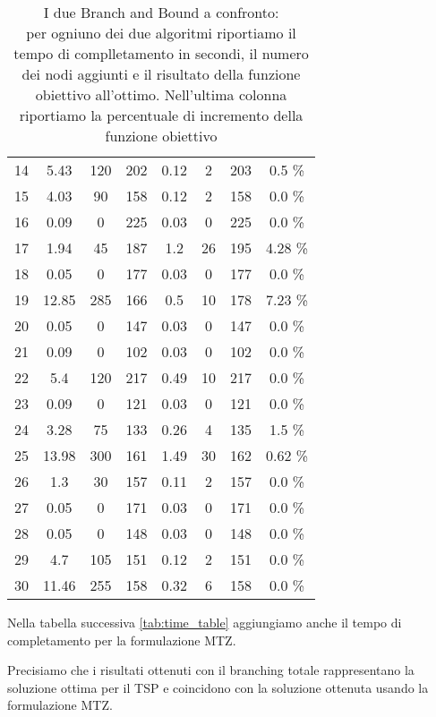\begin{table}[htbp]
\begin{tabular}{|c|c|c|c|c|c|c|c|}
        14 & 5.43 & 120 & 202 & 0.12 & 2 & 203 & 0.5 \% \\
        15 & 4.03 & 90 & 158 & 0.12 & 2 & 158 & 0.0 \% \\
        16 & 0.09 & 0 & 225 & 0.03 & 0 & 225 & 0.0 \% \\
        17 & 1.94 & 45 & 187 & 1.2 & 26 & 195 & 4.28 \% \\
        18 & 0.05 & 0 & 177 & 0.03 & 0 & 177 & 0.0 \% \\
        19 & 12.85 & 285 & 166 & 0.5 & 10 & 178 & 7.23 \% \\
        20 & 0.05 & 0 & 147 & 0.03 & 0 & 147 & 0.0 \% \\
        21 & 0.09 & 0 & 102 & 0.03 & 0 & 102 & 0.0 \% \\
        22 & 5.4 & 120 & 217 & 0.49 & 10 & 217 & 0.0 \% \\
        23 & 0.09 & 0 & 121 & 0.03 & 0 & 121 & 0.0 \% \\
        24 & 3.28 & 75 & 133 & 0.26 & 4 & 135 & 1.5 \% \\
        25 & 13.98 & 300 & 161 & 1.49 & 30 & 162 & 0.62 \% \\
        26 & 1.3 & 30 & 157 & 0.11 & 2 & 157 & 0.0 \% \\
        27 & 0.05 & 0 & 171 & 0.03 & 0 & 171 & 0.0 \% \\
        28 & 0.05 & 0 & 148 & 0.03 & 0 & 148 & 0.0 \% \\
        29 & 4.7 & 105 & 151 & 0.12 & 2 & 151 & 0.0 \% \\
        30 & 11.46 & 255 & 158 & 0.32 & 6 & 158 & 0.0 \% \\
        \hline
    \end{tabular}
    \caption{I due Branch and Bound a confronto:\\
    per ogniuno dei due algoritmi riportiamo il tempo di complletamento in secondi, il numero dei nodi aggiunti e il risultato della funzione obiettivo all'ottimo. Nell'ultima colonna riportiamo la percentuale di incremento della funzione obiettivo}
    \label{tab:bb_incremento_costo}
\end{table}

\newpage

Nella tabella successiva \ref{tab:time_table} aggiungiamo anche il tempo di completamento per la formulazione MTZ.

Precisiamo che i risultati ottenuti con il branching totale rappresentano la soluzione ottima per il TSP e coincidono con la soluzione ottenuta usando la formulazione MTZ.

